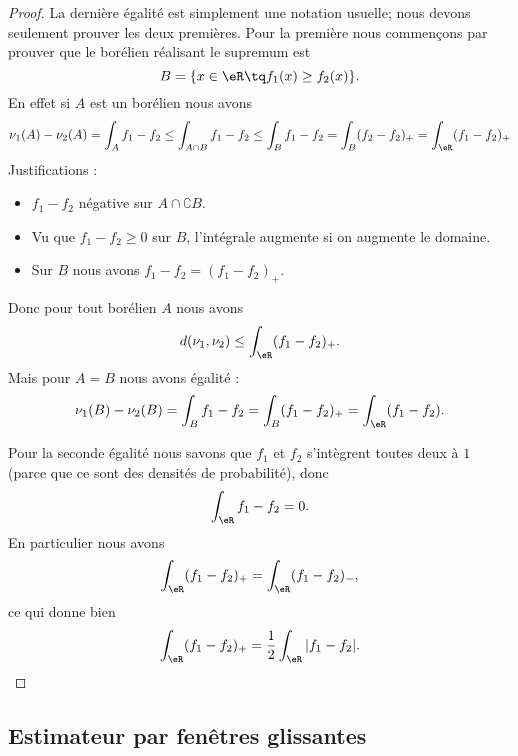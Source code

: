 \begin{proof}
	La dernière égalité est simplement une notation usuelle; nous devons seulement prouver les deux premières. Pour la première nous commençons par prouver que le borélien réalisant le supremum est
	\begin{equation}
		B=\{ x\in\eR\tq f_1(x)\geq f_2(x) \}.
	\end{equation}
	En effet si \( A\) est un borélien nous avons
	\begin{equation}
		\nu_1(A)-\nu_2(A)=\int_Af_1-f_2
		\leq\int_{A\cap B}f_1-f_2
		\leq\int_Bf_1-f_2
		=\int_B(f_2-f_2)_+
		=\int_{\eR}(f_1-f_2)_+
	\end{equation}
	Justifications :
	\begin{itemize}
		\item  \( f_1-f_2\) négative sur \( A\cap \complement B\).
		\item Vu que \( f_1-f_2\geq0\) sur \( B\), l'intégrale augmente si on augmente le domaine.
		\item Sur \( B\) nous avons \( f_1-f_2=(f_1-f_2)_+\).
	\end{itemize}
	Donc pour tout borélien \( A\) nous avons
	\begin{equation}
		d(\nu_1,\nu_2)\leq \int_{\eR}(f_1-f_2)_+.
	\end{equation}
	Mais pour \( A=B\) nous avons égalité :
	\begin{equation}
		\nu_1(B)-\nu_2(B)=\int_{B}f_1-f_2=\int_B(f_1-f_2)_+=\int_{\eR}(f_1-f_2).
	\end{equation}

	Pour la seconde égalité nous savons que \( f_1\) et \( f_2\) s'intègrent toutes deux à \( 1\) (parce que ce sont des densités de probabilité), donc
	\begin{equation}
		\int_{\eR}f_1-f_2=0.
	\end{equation}
	En particulier nous avons
	\begin{equation}
		\int_{\eR}(f_1-f_2)_+=\int_{\eR}(f_1-f_2)_-,
	\end{equation}
	ce qui donne bien
	\begin{equation}
		\int_{\eR}(f_1-f_2)_+=\frac{ 1 }{2}\int_{\eR}|f_1-f_2|.
	\end{equation}
\end{proof}

\subsection{Estimateur par fenêtres glissantes}

